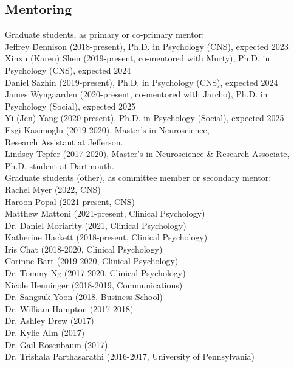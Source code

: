 \documentclass[11pt, letterpaper]{article}
\begin{document}
\subsection*{Mentoring}

\begin{tabbing}
Graduate students, as primary or co-primary mentor: \\  [.1cm]
\hspace{.5in} \= Jeffrey \= Dennison (2018-present), Ph.D. in Psychology (CNS), expected 2023 \\
\> Xinxu (Karen) Shen (2019-present, co-mentored with Murty), Ph.D. in Psychology (CNS), expected 2024 \\
\> Daniel Sazhin (2019-present), Ph.D. in Psychology (CNS), expected 2024 \\
\> James Wyngaarden (2020-present, co-mentored with Jarcho), Ph.D. in Psychology (Social), expected 2025 \\
\> Yi (Jen) Yang (2020-present), Ph.D. in Psychology (Social), expected 2025 \\
\> Ezgi Kasimoglu (2019-2020), Master's in Neuroscience, \\ 
\> \> Research Assistant at Jefferson. \\
\> Lindsey Tepfer (2017-2020), Master's in Neuroscience \& Research Associate, \\
\> \> Ph.D. student at Dartmouth. \\ [.2cm]

Graduate students (other), as committee member or secondary mentor: \\  [.1cm]
\> Rachel Myer (2022, CNS) \\
\> Haroon Popal (2021-present, CNS) \\
\> Matthew Mattoni (2021-present, Clinical Psychology) \\
\> Dr. Daniel Moriarity (2021, Clinical Psychology) \\
\> Katherine Hackett (2018-present, Clinical Psychology) \\
\> Iris Chat (2018-2020, Clinical Psychology) \\
\> Corinne Bart (2019-2020, Clinical Psychology) \\
\> Dr. Tommy Ng (2017-2020, Clinical Psychology) \\
\> Nicole Henninger (2018-2019, Communications) \\
\> Dr. Sangsuk Yoon (2018, Business School) \\
\> Dr. William Hampton (2017-2018) \\
\> Dr. Ashley Drew (2017) \\
\> Dr. Kylie Alm (2017) \\
\> Dr. Gail Rosenbaum (2017) \\
\> Dr. Trishala Parthasarathi (2016-2017, University of Pennsylvania) \\ [.2cm]


\end{tabbing}
\end{document}
